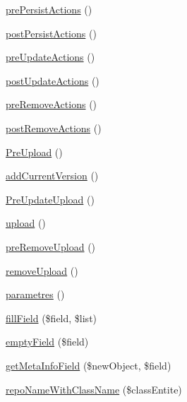 \begin{DoxyCompactItemize}
\hyperlink{class_acme_group_1_1services_1_1entities_services_1_1entity_listener_a0484ef4bf66053f873ffacc619cc897a}{pre\+Persist\+Actions} ()
\item 
\hyperlink{class_acme_group_1_1services_1_1entities_services_1_1entity_listener_abd38323b6894a96e46cd9a2e4f156d50}{post\+Persist\+Actions} ()
\item 
\hyperlink{class_acme_group_1_1services_1_1entities_services_1_1entity_listener_ae13993f954b750e7c7c1de2d15e50cbe}{pre\+Update\+Actions} ()
\item 
\hyperlink{class_acme_group_1_1services_1_1entities_services_1_1entity_listener_aa39ee368ba30ae21993b45cfcea9a574}{post\+Update\+Actions} ()
\item 
\hyperlink{class_acme_group_1_1services_1_1entities_services_1_1entity_listener_ac58a26d97c0c56e08cb4de385276d4dd}{pre\+Remove\+Actions} ()
\item 
\hyperlink{class_acme_group_1_1services_1_1entities_services_1_1entity_listener_aa8beee4790beecdeae660d68f3dbf20d}{post\+Remove\+Actions} ()
\item 
\hyperlink{class_acme_group_1_1services_1_1entities_services_1_1entity_listener_af7067c6a539ac7efe7359d8bbce8e216}{Pre\+Upload} ()
\item 
\hyperlink{class_acme_group_1_1services_1_1entities_services_1_1entity_listener_a121150f5202348d26e8cf8d5b9a61805}{add\+Current\+Version} ()
\item 
\hyperlink{class_acme_group_1_1services_1_1entities_services_1_1entity_listener_a00e2f3aecfb9ccc83aaa4bbb96a822cd}{Pre\+Update\+Upload} ()
\item 
\hyperlink{class_acme_group_1_1services_1_1entities_services_1_1entity_listener_a3890574b3e2451b03dddf2a9b7c9a48c}{upload} ()
\item 
\hyperlink{class_acme_group_1_1services_1_1entities_services_1_1entity_listener_accfa54c9a1114653cc2d093a29fcb2ef}{pre\+Remove\+Upload} ()
\item 
\hyperlink{class_acme_group_1_1services_1_1entities_services_1_1entity_listener_a44f8a5a05f95c608c2a2b23d70883745}{remove\+Upload} ()
\item 
\hyperlink{class_acme_group_1_1services_1_1entities_services_1_1entity_listener_abf746121384434bc55b83bb05dabe34f}{parametres} ()
\item 
\hyperlink{class_acme_group_1_1services_1_1entities_services_1_1entity_listener_a43aafc76dcdbf7f370568197726761ea}{fill\+Field} (\$field, \$list)
\item 
\hyperlink{class_acme_group_1_1services_1_1entities_services_1_1entity_listener_a3205413a21ceda120a7a45f2408da12a}{empty\+Field} (\$field)
\item 
\hyperlink{class_acme_group_1_1services_1_1entities_services_1_1entity_listener_a4b60a9785bbd5039ae9e3d68cd40967e}{get\+Meta\+Info\+Field} (\$new\+Object, \$field)
\item 
\hyperlink{class_acme_group_1_1services_1_1entities_services_1_1entity_listener_a4d2700f836f7b82c5382b6524204bf05}{repo\+Name\+With\+Class\+Name} (\$class\+Entite)
\end{DoxyCompactItemize}
